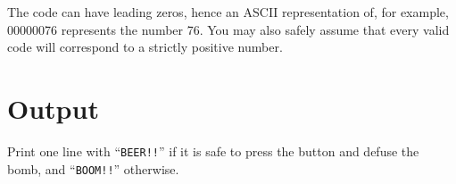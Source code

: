 The code can have leading zeros, hence an ASCII representation of, for example, 00000076
represents the number 76. You may also safely assume that every valid code will correspond
to a strictly positive number.

\section*{Output}

Print one line with ``{\tt BEER!!}'' if it is safe to press the
button and defuse the bomb, and ``{\tt BOOM!!}'' otherwise.
